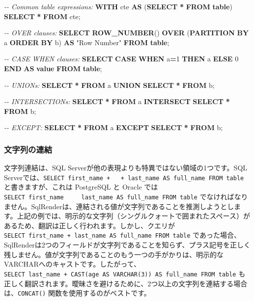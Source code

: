 \documentclass[
  11pt]{book}
\newenvironment{Shaded}{\begin{snugshade}}{\end{snugshade}}
\newcommand{\CommentTok}[1]{\textcolor[rgb]{0.56,0.35,0.01}{\textit{#1}}}
\newcommand{\ControlFlowTok}[1]{\textcolor[rgb]{0.13,0.29,0.53}{\textbf{#1}}}
\newcommand{\DecValTok}[1]{\textcolor[rgb]{0.00,0.00,0.81}{#1}}
\newcommand{\FunctionTok}[1]{\textcolor[rgb]{0.13,0.29,0.53}{\textbf{#1}}}
\newcommand{\KeywordTok}[1]{\textcolor[rgb]{0.13,0.29,0.53}{\textbf{#1}}}
\newcommand{\NormalTok}[1]{#1}
\newcommand{\OperatorTok}[1]{\textcolor[rgb]{0.81,0.36,0.00}{\textbf{#1}}}
\newcommand{\OtherTok}[1]{\textcolor[rgb]{0.56,0.35,0.01}{#1}}
\theoremstyle{definition}
\theoremstyle{definition}
\theoremstyle{definition}
\theoremstyle{definition}
\theoremstyle{remark}
\begin{document}
\begin{Shaded}
\begin{Highlighting}[]
\CommentTok{{-}{-} Common table expressions:}
\KeywordTok{WITH}\NormalTok{ cte }\KeywordTok{AS}\NormalTok{ (}\KeywordTok{SELECT} \OperatorTok{*} \KeywordTok{FROM} \KeywordTok{table}\NormalTok{) }\KeywordTok{SELECT} \OperatorTok{*} \KeywordTok{FROM}\NormalTok{ cte;}

\CommentTok{{-}{-} OVER clauses:}
\KeywordTok{SELECT} \FunctionTok{ROW\_NUMBER}\NormalTok{() }\KeywordTok{OVER}\NormalTok{ (}\KeywordTok{PARTITION} \KeywordTok{BY}\NormalTok{ a }\KeywordTok{ORDER} \KeywordTok{BY}\NormalTok{ b)}
  \KeywordTok{AS} \OtherTok{"Row Number"} \KeywordTok{FROM} \KeywordTok{table}\NormalTok{;}

\CommentTok{{-}{-} CASE WHEN clauses:}
\KeywordTok{SELECT} \ControlFlowTok{CASE} \ControlFlowTok{WHEN}\NormalTok{ a}\OperatorTok{=}\DecValTok{1} \ControlFlowTok{THEN}\NormalTok{ a }\ControlFlowTok{ELSE} \DecValTok{0} \ControlFlowTok{END} \KeywordTok{AS} \FunctionTok{value} \KeywordTok{FROM} \KeywordTok{table}\NormalTok{;}

\CommentTok{{-}{-} UNIONs:}
\KeywordTok{SELECT} \OperatorTok{*} \KeywordTok{FROM}\NormalTok{ a }\KeywordTok{UNION} \KeywordTok{SELECT} \OperatorTok{*} \KeywordTok{FROM}\NormalTok{ b;}

\CommentTok{{-}{-} INTERSECTIONs:}
\KeywordTok{SELECT} \OperatorTok{*} \KeywordTok{FROM}\NormalTok{ a }\KeywordTok{INTERSECT} \KeywordTok{SELECT} \OperatorTok{*} \KeywordTok{FROM}\NormalTok{ b;}

\CommentTok{{-}{-} EXCEPT:}
\KeywordTok{SELECT} \OperatorTok{*} \KeywordTok{FROM}\NormalTok{ a }\KeywordTok{EXCEPT} \KeywordTok{SELECT} \OperatorTok{*} \KeywordTok{FROM}\NormalTok{ b;}
\end{Highlighting}
\end{Shaded}

\subsubsection*{文字列の連結}\label{ux6587ux5b57ux5217ux306eux9023ux7d50}

文字列連結は、SQL Serverが他の表現よりも特異ではない領域の1つです。SQL Serverでは、\texttt{SELECT\ first\_name\ +\ \textquotesingle{}\ \textquotesingle{}\ +\ last\_name\ AS\ full\_name\ FROM\ table} と書きますが、これは PostgreSQL と Oracle では \texttt{SELECT\ first\_name\ \textbar{}\textbar{}\ \textquotesingle{}\ \textquotesingle{}\ \textbar{}\textbar{}\ last\_name\ AS\ full\_name\ FROM\ table} でなければなりません。SqlRenderは、連結される値が文字列であることを推測しようとします。上記の例では、明示的な文字列（シングルクォートで囲まれたスペース）があるため、翻訳は正しく行われます。しかし、クエリが \texttt{SELECT\ first\_name\ +\ last\_name\ AS\ full\_name\ FROM\ table} であった場合、SqlRenderは2つのフィールドが文字列であることを知らず、プラス記号を正しく残しません。値が文字列であることのもう一つの手がかりは、明示的なVARCHARへのキャストです。したがって、\texttt{SELECT\ last\_name\ +\ CAST(age\ AS\ VARCHAR(3))\ AS\ full\_name\ FROM\ table} も正しく翻訳されます。曖昧さを避けるために、2つ以上の文字列を連結する場合は、\texttt{CONCAT()} 関数を使用するのがベストです。
\end{document}
